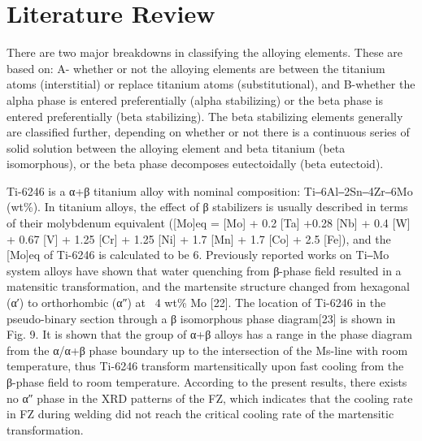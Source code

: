 \chapter{Literature Review}
\iffalse
Titanium can exist in two allotropic forms: alpha (a hexagonal close-packed crystal structure) and beta (a body-cen- tered cubic structure) (Ref 7.1–7.4). In pure tita- nium, the alpha (a) phase is stable up to 880\degC (1620\degF), at which point it transforms to the beta (b) phase; the beta phase is stable from 880\degC (1620 °F) to the melting point. At room temperature, pure titanium consists of the alpha phase. However, the alloys can contain alpha, mixtures of alpha and beta, or beta phases, de- pending on the alloy content and conditions. Thus, the alloys are classified into these structural types: alpha ($\alpha$), alpha-beta ($\alpha$-$\beta$), and beta ($\beta$).
\fi

\degC
There are two major breakdowns in classifying the alloying elements. These are based on: A- whether or not the alloying elements are between the titanium atoms (interstitial) or replace titanium atoms (substitutional), and B-whether the alpha phase is entered preferentially (alpha stabilizing) or the beta phase is entered preferentially (beta stabilizing). The beta stabilizing elements generally are classified further, depending on whether or not there is a continuous series of solid solution between the alloying element and beta titanium (beta isomorphous), or the beta phase decomposes eutectoidally (beta eutectoid).


Ti-6246 is a α+β titanium alloy with nominal composition: Ti‒6Al‒2Sn‒4Zr‒6Mo (wt\%). In titanium alloys, the effect of β stabilizers is usually described in terms of their molybdenum equivalent ([Mo]eq = [Mo] + 0.2 [Ta] +0.28 [Nb] + 0.4 [W] + 0.67 [V] + 1.25 [Cr] + 1.25 [Ni] + 1.7 [Mn] + 1.7 [Co] + 2.5 [Fe]), and the [Mo]eq of Ti-6246 is calculated to be 6. Previously reported works on Ti‒Mo system alloys have shown that water quenching from β-phase field resulted in a matensitic transformation, and the martensite structure changed from hexagonal (α′) to orthorhombic (α″) at ~4 wt\% Mo [22]. The location of Ti-6246 in the pseudo-binary section through
a β isomorphous phase diagram[23] is shown in Fig. 9. It is shown that the group of α+β alloys has a
range in the phase diagram from the α/α+β phase boundary up to the intersection of the Ms-line
with room temperature, thus Ti-6246 transform martensitically upon fast cooling from the β-phase
field to room temperature. According to the present results, there exists no α″ phase in the XRD
patterns of the FZ, which indicates that the cooling rate in FZ during welding did not reach the
critical cooling rate of the martensitic transformation.

